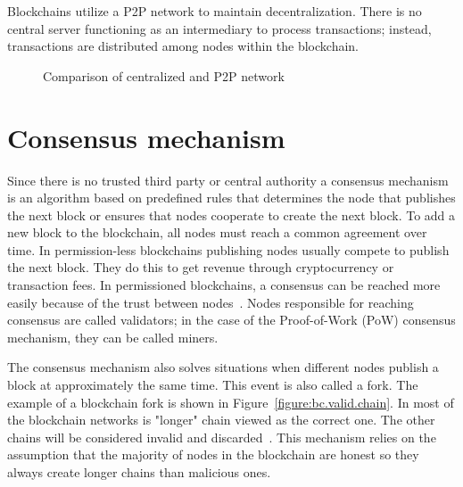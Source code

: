 Blockchains utilize a P2P network to maintain decentralization. There is no central server functioning as an intermediary to process transactions; instead, transactions are distributed among nodes within the blockchain.

\begin{figure}[h]
    \begin{center}
    \end{center}
    \caption{Comparison of centralized and P2P network}
    \label{figure:p2p-network}
\end{figure}


\section{Consensus mechanism}
\label{Consensus mechanism}

Since there is no trusted third party or central authority a consensus mechanism is an algorithm based on predefined rules that determines the node that publishes the next block or ensures that nodes cooperate to create the next block. To add a new block to the blockchain, all nodes must reach a common agreement over time. In permission-less blockchains publishing nodes usually compete to publish the next block. They do this to get revenue through cryptocurrency or transaction fees. In permissioned blockchains, a consensus can be reached more easily because of the trust between nodes~\cite{bc.technology.overview}. Nodes responsible for reaching consensus are called validators; in the case of the Proof-of-Work (PoW) consensus mechanism, they can be called miners.

The consensus mechanism also solves situations when different nodes publish a block at approximately the same time. This event is also called a fork. The example of a blockchain fork is shown in Figure~\ref{figure:bc.valid.chain}. In most of the blockchain networks is "longer" chain viewed as the correct one. The other chains will be considered invalid and discarded~\cite{bc.technology.overview}.
This mechanism relies on the assumption that the majority of nodes in the blockchain are honest so they always create longer chains than malicious ones.

